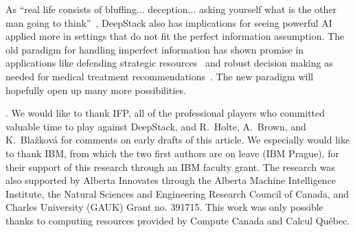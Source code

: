 \documentclass[12pt]{article}
\newif\ifarxiv
\newcounter{lastnote}
\newenvironment{scilastnote}{%
\setcounter{lastnote}{\value{enumiv}}%
\addtocounter{lastnote}{+1}%
\begin{list}%
{\arabic{lastnote}.}
{\setlength{\leftmargin}{.22in}}
{\setlength{\labelsep}{.5em}}}
{\end{list}}
\newenvironment{scilastnote}{\paragraph{Acknowledgements.}}{}
\begin{document}
As ``real life consists of bluffing... deception... asking yourself what is the other man going to think''~\cite{Bronowski73}, DeepStack also has implications for seeing powerful AI applied more in settings that do not fit the perfect information assumption.  The old paradigm for handling imperfect information has shown promise in applications like defending strategic resources~\cite{Lisy16:cfr-security} and robust decision making as needed for medical treatment recommendations~\cite{ChenBowling12}.  The new paradigm will hopefully open up many more possibilities.




\begin{scilastnote}
We would like to thank IFP, all of the professional players who committed valuable time to play against DeepStack, and
R.~Holte, A.~Brown, and K.~Bla\v{z}kov\'a for comments on early drafts of this article.
We especially would like to thank IBM, from which the two first authors are on leave (IBM Prague), for their support of this research through an IBM faculty grant.  
The research was also supported by Alberta Innovates through the Alberta Machine Intelligence Institute, the Natural Sciences and Engineering Research Council of Canada, and Charles University (GAUK) Grant no. 391715.  
This work was only possible thanks to computing resources provided by Compute Canada and Calcul Qu\'ebec.  
\end{scilastnote}

\ifarxiv
\clearpage
\begin{center}
{\LARGE\baselineskip24pt 
Supplementary Materials for \\
{\large DeepStack: Expert-Level AI in No-Limit Poker}
\par\bigskip\bigskip\bigskip
}
\end{center}


\fi
\end{document}

